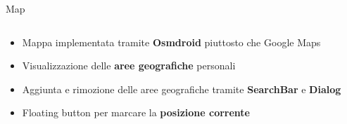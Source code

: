 \documentclass[10pt]{beamer}
\begin{document}
\begin{frame}{Map}
    \begin{columns}
        \begin{column}{0.5\textwidth}
            \hspace*{100pt}
            \begin{itemize}
                \item \small Mappa implementata tramite \textbf{Osmdroid} piuttosto che Google Maps
                \item \small Visualizzazione delle \textbf{aree geografiche} personali
                \item \small Aggiunta e rimozione delle aree geografiche tramite \textbf{SearchBar} e \textbf{Dialog}
                \item \small Floating button per marcare la \textbf{posizione corrente}
            \end{itemize}
        \end{column}
        \begin{column}{0.5\textwidth}
            \begin{center}
            \end{center}
        \end{column}
    \end{columns}
\end{frame}
\end{document}
